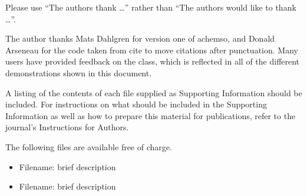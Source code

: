 \documentclass[journal=jacsat,manuscript=article]{achemso}
\begin{document}
\begin{acknowledgement}

  Please use ``The authors thank \ldots'' rather than ``The
  authors would like to thank \ldots''.

  The author thanks Mats Dahlgren for version one of \textsf{achemso},
  and Donald Arseneau for the code taken from \textsf{cite} to move
  citations after punctuation. Many users have provided feedback on the
  class, which is reflected in all of the different demonstrations
  shown in this document.

\end{acknowledgement}

\begin{suppinfo}

  A listing of the contents of each file supplied as Supporting Information
  should be included. For instructions on what should be included in the
  Supporting Information as well as how to prepare this material for
  publications, refer to the journal's Instructions for Authors.

  The following files are available free of charge.
  \begin{itemize}
    \item Filename: brief description
    \item Filename: brief description
  \end{itemize}

\end{suppinfo}


\end{document}
